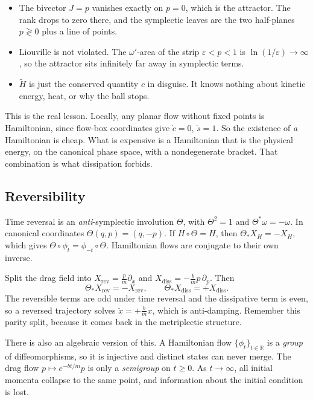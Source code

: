\begin{itemize}
	\item The bivector $J = p$ vanishes exactly on $p = 0$, which is the attractor. The rank drops to zero there, and the symplectic leaves are the two half-planes $p \gtrless 0$ plus a line of points.
	\item Liouville is not violated. The $\omega'$-area of the strip $\varepsilon < p < 1$ is $\ln(1/\varepsilon)\to\infty$, so the attractor sits infinitely far away in symplectic terms.
	\item $\tilde H$ is just the conserved quantity $c$ in disguise. It knows nothing about kinetic energy, heat, or why the ball stops.
\end{itemize}

This is the real lesson. Locally, any planar flow without fixed points is Hamiltonian, since flow-box coordinates give $\dot c = 0$, $\dot s = 1$. So the existence of \emph{a} Hamiltonian is cheap. What is expensive is a Hamiltonian that is the physical energy, on the canonical phase space, with a nondegenerate bracket. That combination is what dissipation forbids.


\subsection{Reversibility}

Time reversal is an \emph{anti}-symplectic involution $\Theta$, with $\Theta^2 = 1$ and $\Theta^*\omega = -\omega$. In canonical coordinates $\Theta(q,p) = (q,-p)$. If $H\circ\Theta = H$, then $\Theta_* X_H = -X_H$, which gives $\Theta\circ\phi_t = \phi_{-t}\circ\Theta$. Hamiltonian flows are conjugate to their own inverse.

Split the drag field into $X_{\mathrm{rev}} = \frac{p}{m}\partial_x$ and $X_{\mathrm{diss}} = -\frac{b}{m}p\,\partial_p$. Then
\[
	\Theta_* X_{\mathrm{rev}} = -X_{\mathrm{rev}}, \qquad \Theta_* X_{\mathrm{diss}} = +X_{\mathrm{diss}} .
\]
The reversible terms are odd under time reversal and the dissipative term is even, so a reversed trajectory solves $\ddot x = +\frac{b}{m}\dot x$, which is anti-damping. Remember this parity split, because it comes back in the metriplectic structure.

There is also an algebraic version of this. A Hamiltonian flow $\{\phi_t\}_{t\in\mathbb{R}}$ is a \emph{group} of diffeomorphisms, so it is injective and distinct states can never merge. The drag flow $p \mapsto e^{-bt/m}p$ is only a \emph{semigroup} on $t\ge 0$. As $t\to\infty$, all initial momenta collapse to the same point, and information about the initial condition is lost.



